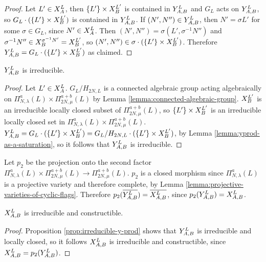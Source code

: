\documentclass[a4paper, 11pt]{report}
\begin{document}
\begin{proof}
Let $L'\in\xprod[L]{A}$, then $\{L'\}\times\xprod[L']{B}$ is contained in $\yprod[L]{A,B}$ and $G_L$ acts on $\yprod[L]{A,B}$, so $G_L\cdot(\{L'\}\times\xprod[L']{B})$ is contained in $\yprod[L]{A,B}$. If $(N',N'')\in\yprod[L]{A,B}$, then $N'=\sigma L'$ for some $\sigma\in G_L$, since $N'\in\xprod[L]{A}$. Then $(N',N'')=\sigma (L',\sigma^{-1}N'')$ and $\sigma^{-1}N''\in\xprod[\sigma^{-1}N']{B}=\xprod[L']{B}$, so $(N',N'')\in\sigma\cdot(\{L'\}\times\xprod[L']{B})$. Therefore $\yprod[L]{A,B}=G_L\cdot(\{L'\}\times\xprod[L']{B})$ as claimed.
\end{proof}

\begin{proposition}\label{prop:irreducible-y-prod}
$\yprod[L]{A,B}$ is irreducible.
\end{proposition}

\begin{proof}
Let $L'\in\xprod[L]{A}$. $G_L/{H_{2N,L}}$ is a connected algebraic group acting algebraically on $\Pi_{N,\lambda}^a(L)\times\Pi_{2N,\mu}^{a+b}(L)$ by Lemma \ref{lemma:connected-algebraic-group}. $\xprod[L']{B}$ is an irreducible locally closed subset of $\Pi_{2N,\mu}^{a+b}(L)$, so $\{L'\}\times\xprod[L']{B}$ is an irreducible locally closed set in $\Pi_{N,\lambda}^a(L)\times\Pi_{2N,\mu}^{a+b}(L)$. $\yprod[L]{A,B}=G_L\cdot (\{L'\}\times\xprod[L']{B}) = G_L/{H_{2N,L}}\cdot (\{L'\}\times\xprod[L']{B})$, by Lemma \ref{lemma:yprod-as-a-saturation}, so it follows that $\yprod[L]{A,B}$ is irreducible.
\end{proof}

Let $p_2$ be the projection onto the second factor $\Pi_{N,\lambda}^a(L)\times\Pi_{2N,\mu}^{a+b}(L)\to\Pi_{2N,\mu}^{a+b}(L)$. $p_2$ is a closed morphism since $\Pi_{N,\lambda}^a(L)$ is a projective variety and therefore complete, by Lemma \ref{lemma:projective-varieties-of-cyclic-flags}. Therefore $p_2(\overline{\yprod[L]{A,B}})=\overline{\xprod[L]{A,B}}$, since $p_2(\yprod[L]{A,B})=\xprod[L]{A,B}$.

\begin{lemma}\label{lemma:irreducible-x-prod}
$\xprod[L]{A,B}$ is irreducible and constructible.
\end{lemma}

\begin{proof}
Proposition \ref{prop:irreducible-y-prod} shows that $\yprod[L]{A,B}$ is irreducible and locally closed, so it follows $\xprod[L]{A,B}$ is irreducible and constructible, since $\xprod[L]{A,B}=p_2(\yprod[L]{A,B})$.
\end{proof}
\end{document}
